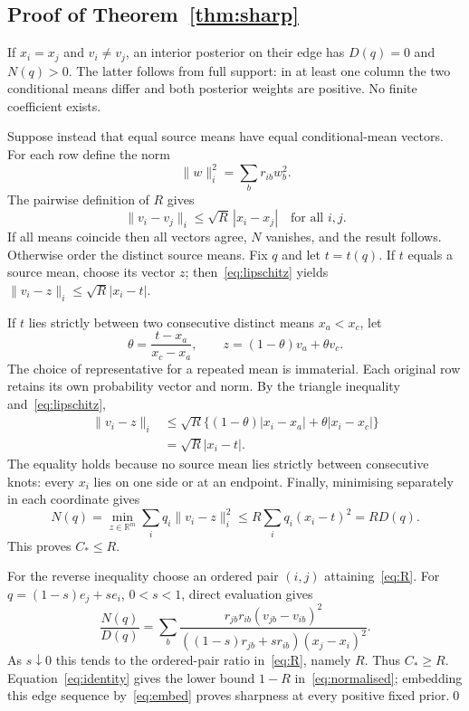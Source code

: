 \documentclass[11pt,a4paper]{article}
\newcommand{\R}{\mathbb R}
\begin{document}
\subsection{Proof of Theorem~\ref{thm:sharp}}
If $x_i=x_j$ and $v_i\ne v_j$, an interior posterior on their edge has $D(q)=0$ and $N(q)>0$. The latter follows from full support: in at least one column the two conditional means differ and both posterior weights are positive. No finite coefficient exists.

Suppose instead that equal source means have equal conditional-mean vectors. For each row define the norm
\[
 \|w\|_i^2=\sum_b r_{ib}w_b^2.
\]
The pairwise definition of $R$ gives
\begin{equation}\label{eq:lipschitz}
 \|v_i-v_j\|_i\leq\sqrt R\,|x_i-x_j|\quad\text{for all }i,j.
\end{equation}
If all means coincide then all vectors agree, $N$ vanishes, and the result follows. Otherwise order the distinct source means. Fix $q$ and let $t=t(q)$. If $t$ equals a source mean, choose its vector $z$; then~\eqref{eq:lipschitz} yields $\|v_i-z\|_i\leq\sqrt R|x_i-t|$.

If $t$ lies strictly between two consecutive distinct means $x_a<x_c$, let
\[
 \theta=\frac{t-x_a}{x_c-x_a},\qquad z=(1-\theta)v_a+\theta v_c.
\]
The choice of representative for a repeated mean is immaterial. Each original row retains its own probability vector and norm. By the triangle inequality and~\eqref{eq:lipschitz},
\begin{align*}
 \|v_i-z\|_i
 &\leq\sqrt R\{(1-\theta)|x_i-x_a|+\theta|x_i-x_c|\}\\
 &=\sqrt R|x_i-t|.
\end{align*}
The equality holds because no source mean lies strictly between consecutive knots: every $x_i$ lies on one side or at an endpoint. Finally, minimising separately in each coordinate gives
\begin{equation}\label{eq:min}
 N(q)=\min_{z\in\R^m}\sum_iq_i\|v_i-z\|_i^2
 \leq R\sum_iq_i(x_i-t)^2=RD(q).
\end{equation}
This proves $C_*\leq R$.

For the reverse inequality choose an ordered pair $(i,j)$ attaining~\eqref{eq:R}. For $q=(1-s)e_j+se_i$, $0<s<1$, direct evaluation gives
\[
 \frac{N(q)}{D(q)}=
 \sum_b\frac{r_{jb}r_{ib}(v_{jb}-v_{ib})^2}
 {((1-s)r_{jb}+sr_{ib})(x_j-x_i)^2}.
\]
As $s\downarrow0$ this tends to the ordered-pair ratio in~\eqref{eq:R}, namely $R$. Thus $C_*\geq R$. Equation~\eqref{eq:identity} gives the lower bound $1-R$ in~\eqref{eq:normalised}; embedding this edge sequence by~\eqref{eq:embed} proves sharpness at every positive fixed prior.\qed
\end{document}
